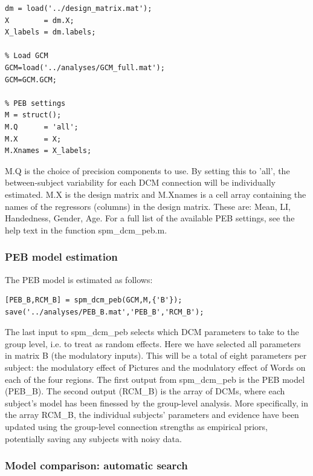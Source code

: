 \documentclass{article}
\begin{document}
\begin{lstlisting}[style=Matlab-editor,caption=PEB specification]
% Load design matrix
dm = load('../design_matrix.mat');
X        = dm.X;
X_labels = dm.labels;

% Load GCM
GCM=load('../analyses/GCM_full.mat');
GCM=GCM.GCM;

% PEB settings
M = struct();
M.Q      = 'all';
M.X      = X;
M.Xnames = X_labels;
\end{lstlisting}

M.Q is the choice of precision components to use. By setting this to 'all', the between-subject variability for each DCM connection will be individually estimated. M.X is the design matrix and M.Xnames is a cell array containing the names of the regressors (columns) in the design matrix. These are: Mean, LI, Handedness, Gender, Age. For a full list of the available PEB settings, see the help text in the function spm\_dcm\_peb.m. 

\subsubsection{PEB model estimation}
The PEB model is estimated as follows:

\begin{lstlisting}[style=Matlab-editor,caption=PEB estimation]
[PEB_B,RCM_B] = spm_dcm_peb(GCM,M,{'B'});
save('../analyses/PEB_B.mat','PEB_B','RCM_B');
\end{lstlisting}

The last input to spm\_dcm\_peb selects which DCM parameters to take to the group level, i.e. to treat as random effects. Here we have selected all parameters in matrix B (the modulatory inputs). This will be a total of eight parameters per subject: the modulatory effect of Pictures and the modulatory effect of Words on each of the four regions. The first output from spm\_dcm\_peb is the PEB model (PEB\_B). The second output (RCM\_B) is the array of DCMs, where each subject's model has been finessed by the group-level analysis. More specifically, in the array RCM\_B, the individual subjects' parameters and evidence have been updated using the group-level connection strengths as empirical priors, potentially saving any subjects with noisy data.

\subsubsection{Model comparison: automatic search}
\end{document}

